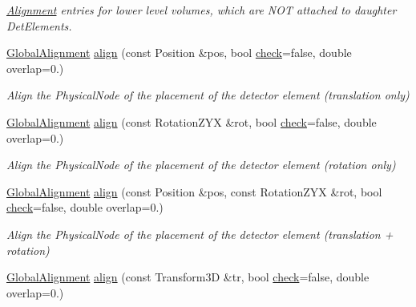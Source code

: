 \begin{DoxyCompactItemize}
\begin{DoxyCompactList}\small\item\em \hyperlink{class_d_d4hep_1_1_alignments_1_1_alignment}{Alignment} entries for lower level volumes, which are N\+OT attached to daughter Det\+Elements. \end{DoxyCompactList}\item 
\hyperlink{class_d_d4hep_1_1_alignments_1_1_global_alignment}{Global\+Alignment} \hyperlink{class_d_d4hep_1_1_alignments_1_1_global_detector_alignment_a5423eff6a3f3a03fc45c6563d82ee256}{align} (const Position \&pos, bool \hyperlink{class_d_d4hep_1_1_geometry_1_1_det_element_aee32c6df93ab1cb7d6dc36e7ae855112}{check}=false, double overlap=0.)
\begin{DoxyCompactList}\small\item\em Align the Physical\+Node of the placement of the detector element (translation only) \end{DoxyCompactList}\item 
\hyperlink{class_d_d4hep_1_1_alignments_1_1_global_alignment}{Global\+Alignment} \hyperlink{class_d_d4hep_1_1_alignments_1_1_global_detector_alignment_ae865aabbab6f92bff3bc6dd8c10898fc}{align} (const Rotation\+Z\+YX \&rot, bool \hyperlink{class_d_d4hep_1_1_geometry_1_1_det_element_aee32c6df93ab1cb7d6dc36e7ae855112}{check}=false, double overlap=0.)
\begin{DoxyCompactList}\small\item\em Align the Physical\+Node of the placement of the detector element (rotation only) \end{DoxyCompactList}\item 
\hyperlink{class_d_d4hep_1_1_alignments_1_1_global_alignment}{Global\+Alignment} \hyperlink{class_d_d4hep_1_1_alignments_1_1_global_detector_alignment_a11e7e399711724497cb9321e74e3e345}{align} (const Position \&pos, const Rotation\+Z\+YX \&rot, bool \hyperlink{class_d_d4hep_1_1_geometry_1_1_det_element_aee32c6df93ab1cb7d6dc36e7ae855112}{check}=false, double overlap=0.)
\begin{DoxyCompactList}\small\item\em Align the Physical\+Node of the placement of the detector element (translation + rotation) \end{DoxyCompactList}\item 
\hyperlink{class_d_d4hep_1_1_alignments_1_1_global_alignment}{Global\+Alignment} \hyperlink{class_d_d4hep_1_1_alignments_1_1_global_detector_alignment_af25045f4135b7688c2ec8df38a4f6128}{align} (const Transform3D \&tr, bool \hyperlink{class_d_d4hep_1_1_geometry_1_1_det_element_aee32c6df93ab1cb7d6dc36e7ae855112}{check}=false, double overlap=0.)

\end{DoxyCompactItemize}
